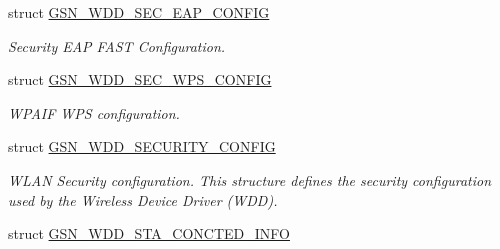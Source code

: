 \begin{DoxyCompactItemize}
struct \hyperlink{a00287}{GSN\_\-WDD\_\-SEC\_\-EAP\_\-CONFIG}
\begin{DoxyCompactList}\small\item\em Security EAP FAST Configuration. \end{DoxyCompactList}\item 
struct \hyperlink{a00296}{GSN\_\-WDD\_\-SEC\_\-WPS\_\-CONFIG}
\begin{DoxyCompactList}\small\item\em WPAIF WPS configuration. \end{DoxyCompactList}\item 
struct \hyperlink{a00297}{GSN\_\-WDD\_\-SECURITY\_\-CONFIG}
\begin{DoxyCompactList}\small\item\em WLAN Security configuration. This structure defines the security configuration used by the Wireless Device Driver (WDD). \end{DoxyCompactList}\item 
struct \hyperlink{a00298}{GSN\_\-WDD\_\-STA\_\-CONCTED\_\-INFO}
\end{DoxyCompactItemize}
